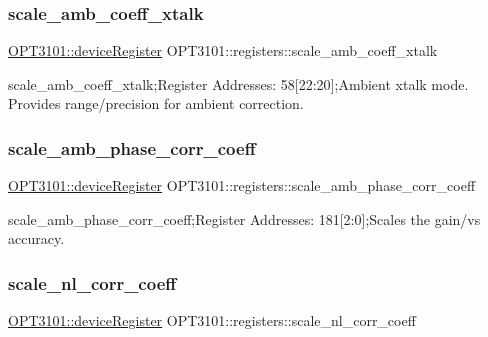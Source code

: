 \subsubsection{\texorpdfstring{scale\+\_\+amb\+\_\+coeff\+\_\+xtalk}{scale\_amb\_coeff\_xtalk}}
{\footnotesize\ttfamily \mbox{\hyperlink{class_o_p_t3101_1_1device_register}{O\+P\+T3101\+::device\+Register}} O\+P\+T3101\+::registers\+::scale\+\_\+amb\+\_\+coeff\+\_\+xtalk}



scale\+\_\+amb\+\_\+coeff\+\_\+xtalk;Register Addresses\+: 58\mbox{[}22\+:20\mbox{]};Ambient xtalk mode. Provides range/precision for ambient correction. 

\mbox{\label{class_o_p_t3101_1_1registers_aa72ff09dcba134f78340ba3cd9b1fa07}} 
\subsubsection{\texorpdfstring{scale\+\_\+amb\+\_\+phase\+\_\+corr\+\_\+coeff}{scale\_amb\_phase\_corr\_coeff}}
{\footnotesize\ttfamily \mbox{\hyperlink{class_o_p_t3101_1_1device_register}{O\+P\+T3101\+::device\+Register}} O\+P\+T3101\+::registers\+::scale\+\_\+amb\+\_\+phase\+\_\+corr\+\_\+coeff}



scale\+\_\+amb\+\_\+phase\+\_\+corr\+\_\+coeff;Register Addresses\+: 181\mbox{[}2\+:0\mbox{]};Scales the gain/vs accuracy. 

\mbox{\label{class_o_p_t3101_1_1registers_a8be7ea17637153d221e4198caea67452}} 
\subsubsection{\texorpdfstring{scale\+\_\+nl\+\_\+corr\+\_\+coeff}{scale\_nl\_corr\_coeff}}
{\footnotesize\ttfamily \mbox{\hyperlink{class_o_p_t3101_1_1device_register}{O\+P\+T3101\+::device\+Register}} O\+P\+T3101\+::registers\+::scale\+\_\+nl\+\_\+corr\+\_\+coeff}



